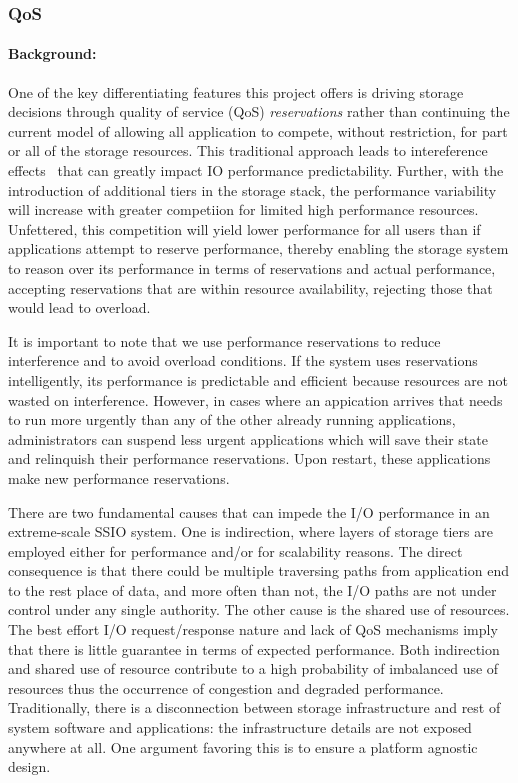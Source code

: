 \subsubsection{QoS}

\paragraph{Background:} One of the key differentiating features this project offers is driving storage
decisions through quality of service (QoS) \emph{reservations} rather than continuing the current model of allowing
all application to compete, without restriction, for part or all of the storage
resources. This traditional approach leads to intereference
effects~\cite{lofstead:2010:adaptive} that can greatly impact IO performance
predictability. Further, with the introduction of additional tiers in the
storage stack, the performance variability will increase with greater
competiion for limited high performance resources. Unfettered, this competition
will yield lower performance for all users than if applications attempt to reserve performance, thereby enabling the storage system to reason over its performance in terms of reservations and actual performance, accepting reservations that are within resource availability, rejecting those that would lead to overload. 

It is important to note that we use performance reservations to reduce interference and to avoid overload conditions. If the system uses reservations intelligently, its performance is predictable and efficient because resources are not wasted on interference. However, in cases where an appication arrives that needs to run more urgently than any of the other already running applications, administrators can suspend less urgent applications which will save their state and relinquish their performance reservations. Upon restart, these applications make new performance reservations.

There are two fundamental causes that can impede the I/O performance in an extreme-scale SSIO system. One is indirection, where layers of storage tiers are employed either for performance and/or for scalability reasons.  The direct consequence is that there could be multiple traversing paths from application end to the rest place of data, and more often than not, the I/O paths are not under control under any single authority. The other cause is the shared use of resources. The best effort I/O request/response nature and lack of QoS mechanisms imply that there is little guarantee in terms of expected performance.  Both indirection and shared use of resource contribute to a high probability of imbalanced use of resources thus the occurrence of congestion and degraded performance. Traditionally, there is a disconnection between storage infrastructure and rest of system software and applications: the infrastructure details are not exposed anywhere at all. One argument favoring this is to ensure a platform agnostic design. 

